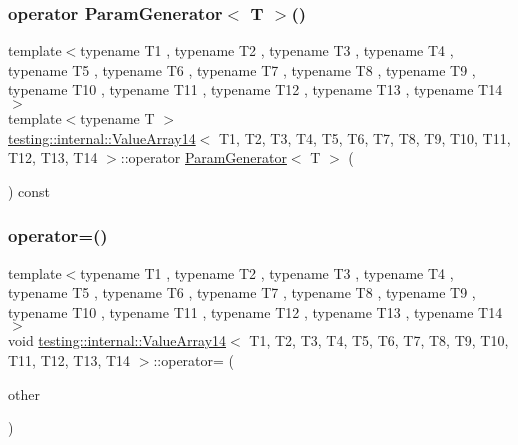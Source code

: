\subsubsection{\texorpdfstring{operator ParamGenerator$<$ T $>$()}{operator ParamGenerator< T >()}}
{\footnotesize\ttfamily template$<$typename T1 , typename T2 , typename T3 , typename T4 , typename T5 , typename T6 , typename T7 , typename T8 , typename T9 , typename T10 , typename T11 , typename T12 , typename T13 , typename T14 $>$ \\
template$<$typename T $>$ \\
\mbox{\hyperlink{classtesting_1_1internal_1_1_value_array14}{testing\+::internal\+::\+Value\+Array14}}$<$ T1, T2, T3, T4, T5, T6, T7, T8, T9, T10, T11, T12, T13, T14 $>$\+::operator \mbox{\hyperlink{classtesting_1_1internal_1_1_param_generator}{Param\+Generator}}$<$ T $>$ (\begin{DoxyParamCaption}{ }\end{DoxyParamCaption}) const\hspace{0.3cm}{\ttfamily [inline]}}

\mbox{\label{classtesting_1_1internal_1_1_value_array14_ac3f2c8db9a16c34a79e09b4529082c43}} 
\subsubsection{\texorpdfstring{operator=()}{operator=()}}
{\footnotesize\ttfamily template$<$typename T1 , typename T2 , typename T3 , typename T4 , typename T5 , typename T6 , typename T7 , typename T8 , typename T9 , typename T10 , typename T11 , typename T12 , typename T13 , typename T14 $>$ \\
void \mbox{\hyperlink{classtesting_1_1internal_1_1_value_array14}{testing\+::internal\+::\+Value\+Array14}}$<$ T1, T2, T3, T4, T5, T6, T7, T8, T9, T10, T11, T12, T13, T14 $>$\+::operator= (\begin{DoxyParamCaption}\item[{const \mbox{\hyperlink{classtesting_1_1internal_1_1_value_array14}{Value\+Array14}}$<$ T1, T2, T3, T4, T5, T6, T7, T8, T9, T10, T11, T12, T13, T14 $>$ \&}]{other }\end{DoxyParamCaption})\hspace{0.3cm}{\ttfamily [private]}}




